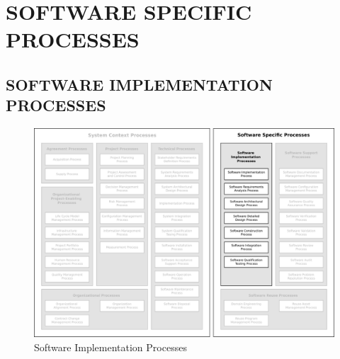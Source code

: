 \section{SOFTWARE SPECIFIC PROCESSES \label{sec:software_specific_processes}}

	\subsection{SOFTWARE IMPLEMENTATION PROCESSES\label{subsec:software_implementation_processes}}

		\begin{figure}[h]
			\centering
			\includegraphics[width=15cm,keepaspectratio]{figures/life-cycle-process-groups-software-implementation-processes.pdf}
			\caption{Software Implementation Processes}
			\label{fig:software_implementation_processes}
		\end{figure}

